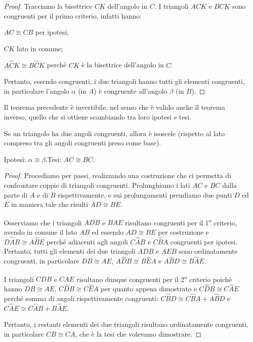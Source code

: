 \begin{proof}
Tracciamo la bisettrice $CK$ dell'angolo in $C$.
I triangoli $ACK$ e $BCK$ sono congruenti per il primo criterio, 
infatti hanno:
\begin{itemize*}
\item $AC\cong CB$ per ipotesi;
\item $CK$ lato in comune;
\item $A\widehat{C}K\cong B\widehat{C}K$ perché $CK$ è la bisettrice 
dell'angolo in $C$.
\end{itemize*}
Pertanto, essendo congruenti, i due triangoli hanno tutti gli 
elementi congruenti, in particolare l'angolo $\alpha$ (in $A$) è 
congruente all'angolo $\beta$ (in $B$).
\end{proof}

Il teorema precedente è invertibile, nel senso che è valido anche il 
teorema inverso, quello che si ottiene scambiando tra loro ipotesi e 
tesi.

\begin{teorema}
Se un triangolo ha due angoli congruenti, allora è isoscele (rispetto 
al lato compreso tra gli angoli congruenti preso come base).
\end{teorema}


\begin{inaccessibleblock}
 \begin{figure}[htb]
\centering
\end{figure}
\end{inaccessibleblock}

\noindent Ipotesi: $\alpha\cong \beta$.\tab Tesi: $AC\cong BC$.

\begin{proof}
Procediamo per passi, realizzando una costruzione che ci permetta di 
confrontare coppie di triangoli congruenti. Prolunghiamo i lati $AC$ 
e $BC$ dalla parte di $A$ e di $B$ rispettivamente, e sui 
prolungamenti prendiamo due punti $D$ ed $E$ in maniera tale che 
risulti $AD\cong BE$.

Osserviamo che i triangoli $ADB$ e $BAE$ risultano congruenti per il 
1\textsuperscript{o} criterio, avendo in comune il lato $AB$ ed 
essendo $AD\cong BE$ per costruzione e $D\widehat{A}B\cong 
A\widehat{B}E$ perché adiacenti agli angoli $C\widehat{A}B$ e 
$C\widehat{B}A$ congruenti per ipotesi. Pertanto, tutti gli elementi 
dei due triangoli $ADB$ e $AEB$ sono ordinatamente congruenti, in 
particolare $DB\cong AE$, $A\widehat{D}B\cong B\widehat{E}A$ e 
$A\widehat{B}D\cong B\widehat{A}E$.

I triangoli $CDB$ e $CAE$ risultano dunque congruenti per il 
2\textsuperscript{o} criterio poiché hanno $DB\cong AE$, 
$C\widehat{D}B\cong C\widehat{E}A$ per quanto appena dimostrato e 
$C\widehat{D}B\cong C\widehat{A}E$ perché somma di angoli 
rispettivamente congruenti: $C\widehat{B}D\cong C\widehat{B}A + 
A\widehat{B}D$ e $C\widehat{A}E\cong C\widehat{A}B + B\widehat{A}E$.

Pertanto, i restanti elementi dei due triangoli risultano 
ordinatamente congruenti, in particolare $CB\cong CA$, che è la tesi 
che volevamo dimostrare.
\end{proof}



